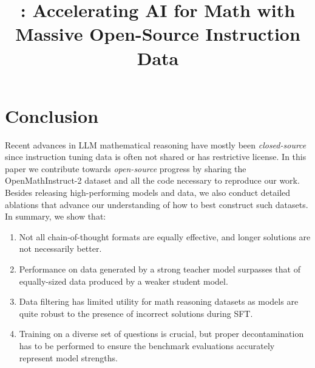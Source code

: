 \documentclass[10pt, logo, twocolumn, copyright, nonumbering]{nvidiatechreport}
\title{\dataset: Accelerating AI for Math with Massive Open-Source Instruction Data}
\author{
\centering {Shubham Toshniwal, Wei Du, Ivan Moshkov, Branislav Kisacanin \hspace{1.8in}Alexan Ayrapetyan, Igor Gitman
}
}
\newcommand{\dataset}[0]{OpenMathInstruct-2\xspace}
\begin{document}
\maketitle








\section{Conclusion}
Recent advances in LLM mathematical reasoning have mostly been \emph{closed-source} since instruction tuning data is often not shared or has restrictive license. In this paper we contribute towards \emph{open-source} progress by sharing the \dataset dataset and all the code necessary to reproduce our work. Besides releasing high-performing models and data, we also conduct detailed ablations that advance our understanding of how to best construct such datasets. In summary, we show that:  
\begin{enumerate}[label=\alph*)]
    \setlength{\itemsep}{0pt} %
    \item Not all chain-of-thought formats are equally effective, and longer solutions are not necessarily better.
    \item Performance on data generated by a strong teacher model surpasses that of equally-sized data produced by a weaker student model.
    \item Data filtering has limited utility for math reasoning datasets as models are quite robust to the presence of incorrect solutions during SFT.
    \item Training on a diverse set of questions is crucial, but proper decontamination has to be performed to ensure the benchmark evaluations accurately represent model strengths.
\end{enumerate}










\clearpage
\appendix



\end{document}
